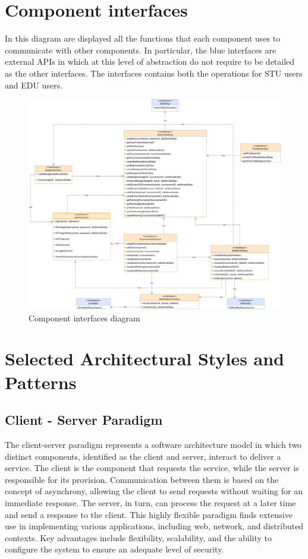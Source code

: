 \section{Component interfaces}
In this diagram are displayed all the functions that each component uses to communicate with other components. In particular, the blue interfaces are external APIs in which at this level of abstraction do not require to be detailed as the other interfaces. The interfaces contains both the operations for STU users and EDU users.
\begin{figure}[H]
    \centering
    \includegraphics[width=\textwidth]{images/diagrams/ComponentInterfaces.png}
    \caption{Component interfaces diagram}
\end{figure}

\newpage

\section{Selected Architectural Styles and Patterns}
\subsection{Client - Server Paradigm}
The client-server paradigm represents a software architecture model in which two distinct components, identified as the client and server, interact to deliver a service.
The client is the component that requests the service, while the server is responsible for its provision.
Communication between them is based on the concept of asynchrony, allowing the client to send requests without waiting for an immediate response.
The server, in turn, can process the request at a later time and send a response to the client. This highly flexible paradigm finds extensive use in implementing various applications, including web, network, and distributed contexts.
Key advantages include flexibility, scalability, and the ability to configure the system to ensure an adequate level of security.


